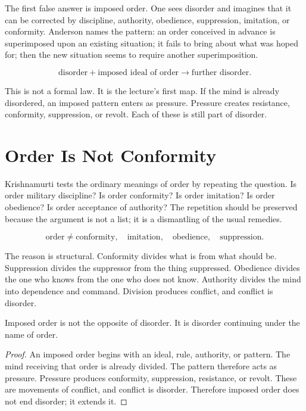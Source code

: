 \documentclass[11pt,oneside]{book}
\begin{document}
The first false answer is imposed order. One sees disorder and imagines that it can be corrected by discipline, authority, obedience, suppression, imitation, or conformity. Anderson names the pattern: an order conceived in advance is superimposed upon an existing situation; it fails to bring about what was hoped for; then the new situation seems to require another superimposition.

\begin{equation}
\text{disorder}
+
\text{imposed ideal of order}
\longrightarrow
\text{further disorder}.
\end{equation}

This is not a formal law. It is the lecture's first map. If the mind is already disordered, an imposed pattern enters as pressure. Pressure creates resistance, conformity, suppression, or revolt. Each of these is still part of disorder.

\section{Order Is Not Conformity}

Krishnamurti tests the ordinary meanings of order by repeating the question. Is order military discipline? Is order conformity? Is order imitation? Is order obedience? Is order acceptance of authority? The repetition should be preserved because the argument is not a list; it is a dismantling of the usual remedies.

\begin{equation}
\text{order}
\neq
\text{conformity},\quad
\text{imitation},\quad
\text{obedience},\quad
\text{suppression}.
\end{equation}

The reason is structural. Conformity divides what is from what should be. Suppression divides the suppressor from the thing suppressed. Obedience divides the one who knows from the one who does not know. Authority divides the mind into dependence and command. Division produces conflict, and conflict is disorder.

\begin{proposition}
Imposed order is not the opposite of disorder. It is disorder continuing under the name of order.
\end{proposition}

\begin{proof}
An imposed order begins with an ideal, rule, authority, or pattern. The mind receiving that order is already divided. The pattern therefore acts as pressure. Pressure produces conformity, suppression, resistance, or revolt. These are movements of conflict, and conflict is disorder. Therefore imposed order does not end disorder; it extends it.
\end{proof}
\end{document}
